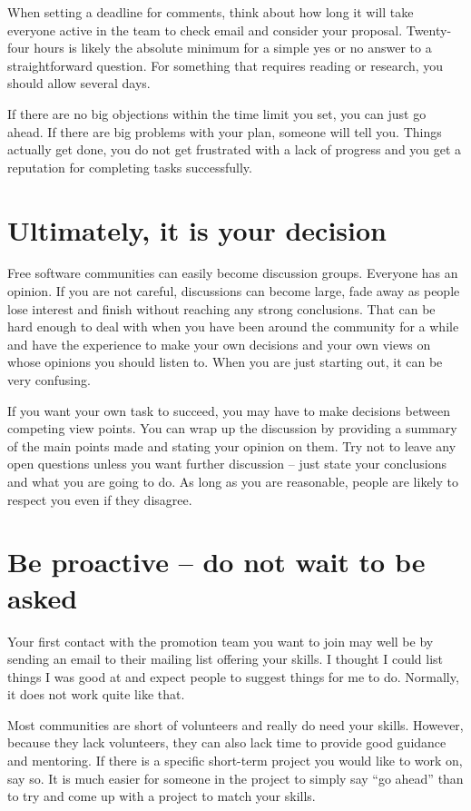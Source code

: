 When setting a deadline for comments, think about how long it will take everyone active in the team to check email and consider your proposal. Twenty-four hours is likely the absolute minimum for a simple yes or no answer to a straightforward question. For something that requires reading or research, you should allow several days.

If there are no big objections within the time limit you set, you can just go ahead. If there are big problems with your plan, someone will tell you. Things actually get done, you do not get frustrated with a lack of progress and you get a reputation for completing tasks successfully.

\section*{Ultimately, it is your decision}

Free software communities can easily become discussion groups. Everyone has an opinion. If you are not careful, discussions can become large, fade away as people lose interest and finish without reaching any strong conclusions. That can be hard enough to deal with when you have been around the community for a while and have the experience to make your own decisions and your own views on whose opinions you should listen to. When you are just starting out, it can be very confusing.

If you want your own task to succeed, you may have to make decisions between competing view points. You can wrap up the discussion by providing a summary of the main points made and stating your opinion on them. Try not to leave any open questions unless you want further discussion -- just state your conclusions and what you are going to do. As long as you are reasonable, people are likely to respect you even if they disagree.

\section*{Be proactive -- do not wait to be asked}

Your first contact with the promotion team you want to join may well be by sending an email to their mailing list offering your skills. I thought I could list things I was good at and expect people to suggest things for me to do. Normally, it does not work quite like that.

Most communities are short of volunteers and really do need your skills. However, because they lack volunteers, they can also lack time to provide good guidance and mentoring. If there is a specific short-term project you would like to work on, say so. It is much easier for someone in the project to simply say ``go ahead'' than to try and come up with a project to match your skills.

